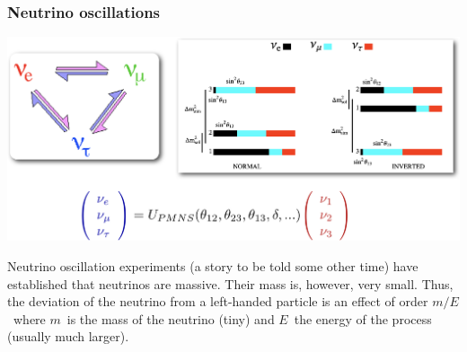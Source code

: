 \begin{frame}
\frametitle{Neutrino oscillations}
\includegraphics[scale=0.30]{img/neutrinoOscillations.png}

Neutrino oscillation experiments (a story to be told some other time) \alert{have established that neutrinos are massive}. Their mass is, however, very small. Thus, the deviation of the neutrino from a left-handed particle is an effect of order $m/E$~where $m$~is the mass of the neutrino (tiny) and $E$~the energy of the process (usually much larger). 
\end{frame}






